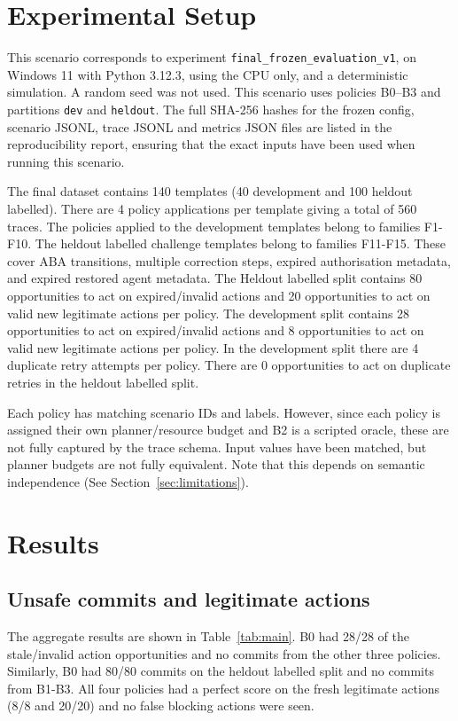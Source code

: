 \documentclass[conference]{IEEEtran}
\begin{document}
\section{Experimental Setup}
This scenario corresponds to experiment \texttt{final\_frozen\_evaluation\_v1}, on Windows 11 with Python 3.12.3, using the CPU only, and a deterministic simulation. A random seed was not used. This scenario uses policies B0--B3 and partitions \texttt{dev} and \texttt{heldout}. The full SHA-256 hashes for the frozen config, scenario JSONL, trace JSONL and metrics JSON files are listed in the reproducibility report, ensuring that the exact inputs have been used when running this scenario.

The final dataset contains 140 templates (40 development and 100 heldout labelled). There are 4 policy applications per template giving a total of 560 traces. The policies applied to the development templates belong to families F1-F10. The heldout labelled challenge templates belong to families F11-F15. These cover ABA transitions, multiple correction steps, expired authorisation metadata, and expired restored agent metadata. The Heldout labelled split contains 80 opportunities to act on expired/invalid actions and 20 opportunities to act on valid new legitimate actions per policy. The development split contains 28 opportunities to act on expired/invalid actions and 8 opportunities to act on valid new legitimate actions per policy. In the development split there are 4 duplicate retry attempts per policy. There are 0 opportunities to act on duplicate retries in the heldout labelled split.

Each policy has matching scenario IDs and labels. However, since each policy is assigned their own planner/resource budget and B2 is a scripted oracle, these are not fully captured by the trace schema. Input values have been matched, but planner budgets are not fully equivalent. Note that this depends on semantic independence (See Section~\ref{sec:limitations}).


\section{Results}
\subsection{Unsafe commits and legitimate actions}
The aggregate results are shown in Table~\ref{tab:main}. B0 had 28/28 of the stale/invalid action opportunities and no commits from the other three policies. Similarly, B0 had 80/80 commits on the heldout labelled split and no commits from B1-B3. All four policies had a perfect score on the fresh legitimate actions (8/8 and 20/20) and no false blocking actions were seen.
\end{document}
